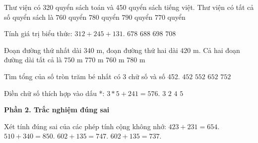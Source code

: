 \begin{ex} %
Thư viện có 320 quyển sách toán và 450 quyển sách tiếng việt. Thư viện có tất cả số quyển sách là
\choice
{$760$ quyển}
{$780$ quyển}
{$790$ quyển}
{\True $770$ quyển}
\end{ex}

\begin{ex} %
Tính giá trị biểu thức: $312 + 245 + 131$.
\choice
{$678$}
{\True $688$}
{$698$}
{$708$}
\end{ex}

\begin{ex} %
Đoạn đường thứ nhất dài $340\text{ m}$, đoạn đường thứ hai dài $420\text{ m}$. Cả hai đoạn đường dài tất cả là
\choice
{$750\text{ m}$}
{$770\text{ m}$}
{\True $760\text{ m}$}
{$780\text{ m}$}
\end{ex}

\begin{ex} %
Tìm tổng của số tròn trăm bé nhất có 3 chữ số và số 452.
\choice
{$452$}
{\True $552$}
{$652$}
{$752$}
\end{ex}

\begin{ex} %
Điền chữ số thích hợp vào dấu *: $3*5 + 241 = 576$.
\choice
{\True $3$}
{$2$}
{$4$}
{$5$}
\end{ex}

\textbf{Phần 2. Trắc nghiệm đúng sai}

\begin{ex} %
Xét tính đúng sai của các phép tính cộng không nhớ:
\choiceTF
{\True $423 + 231 = 654$.}
{\True $510 + 340 = 850$.}
{$602 + 135 = 747$.}
{\True $602 + 135 = 737$.}
\end{ex}

